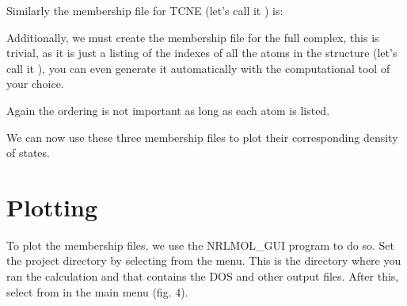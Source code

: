 \documentclass[letterpaper,10pt,english,openany,oneside]{sphinxmanual}
\begin{document}
\sphinxAtStartPar
Similarly the membership file for TCNE (let’s call it ) is:

\begin{sphinxVerbatim}[commandchars=\\\{\}]
\end{sphinxVerbatim}

\sphinxAtStartPar
Additionally, we must create the membership file for the full complex, this is trivial, as it is just a listing of the indexes of all the atoms in the structure (let’s call it ), you can even generate it automatically with the computational tool of your choice.

\begin{sphinxVerbatim}[commandchars=\\\{\}]
\end{sphinxVerbatim}

\sphinxAtStartPar
Again the ordering is not important as long as each atom is listed.

\sphinxAtStartPar
We can now use these three membership files to plot their corresponding density of states.


\section{Plotting}
\label{\detokenize{tutorials/ddos/density_of_states:plotting}}
\sphinxAtStartPar
To plot the membership files, we use the NRLMOL\_GUI program to do so. Set the project directory by selecting  from the  menu. This is the directory where you ran the calculation and that contains the DOS and other output files.  After this, select  from  in the main menu (fig. 4).

\begin{figure}[htbp]
\centering

\noindent{}
\end{figure}
\end{document}
